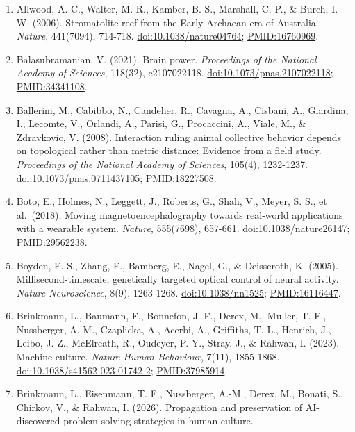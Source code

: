 \documentclass[10pt,letterpaper]{article}
\providecommand{\tightlist}{\setlength{\itemsep}{1pt}\setlength{\parskip}{0pt}}
\begin{document}
\begin{enumerate}
\def\labelenumi{\arabic{enumi}.}
\tightlist
\item
  Allwood, A. C., Walter, M. R., Kamber, B. S., Marshall, C. P., \&
  Burch, I. W. (2006). Stromatolite reef from the Early Archaean era of
  Australia. \emph{Nature}, 441(7094), 714-718.
  \href{https://doi.org/10.1038/nature04764}{doi:10.1038/nature04764};
  \url{PMID:16760969}.
\item
  Balasubramanian, V. (2021). Brain power. \emph{Proceedings of the
  National Academy of Sciences}, 118(32), e2107022118.
  \href{https://doi.org/10.1073/pnas.2107022118}{doi:10.1073/pnas.2107022118};
  \url{PMID:34341108}.
\item
  Ballerini, M., Cabibbo, N., Candelier, R., Cavagna, A., Cisbani, A.,
  Giardina, I., Lecomte, V., Orlandi, A., Parisi, G., Procaccini, A.,
  Viale, M., \& Zdravkovic, V. (2008). Interaction ruling animal
  collective behavior depends on topological rather than metric
  distance: Evidence from a field study. \emph{Proceedings of the
  National Academy of Sciences}, 105(4), 1232-1237.
  \href{https://doi.org/10.1073/pnas.0711437105}{doi:10.1073/pnas.0711437105};
  \url{PMID:18227508}.
\item
  Boto, E., Holmes, N., Leggett, J., Roberts, G., Shah, V., Meyer, S.
  S., et al.~(2018). Moving magnetoencephalography towards real-world
  applications with a wearable system. \emph{Nature}, 555(7698),
  657-661.
  \href{https://doi.org/10.1038/nature26147}{doi:10.1038/nature26147};
  \url{PMID:29562238}.
\item
  Boyden, E. S., Zhang, F., Bamberg, E., Nagel, G., \& Deisseroth, K.
  (2005). Millisecond-timescale, genetically targeted optical control of
  neural activity. \emph{Nature Neuroscience}, 8(9), 1263-1268.
  \href{https://doi.org/10.1038/nn1525}{doi:10.1038/nn1525};
  \url{PMID:16116447}.
\item
  Brinkmann, L., Baumann, F., Bonnefon, J.-F., Derex, M., Muller, T. F.,
  Nussberger, A.-M., Czaplicka, A., Acerbi, A., Griffiths, T. L.,
  Henrich, J., Leibo, J. Z., McElreath, R., Oudeyer, P.-Y., Stray, J.,
  \& Rahwan, I. (2023). Machine culture. \emph{Nature Human Behaviour},
  7(11), 1855-1868.
  \href{https://doi.org/10.1038/s41562-023-01742-2}{doi:10.1038/s41562-023-01742-2};
  \url{PMID:37985914}.
\item
  Brinkmann, L., Eisenmann, T. F., Nussberger, A.-M., Derex, M., Bonati,
  S., Chirkov, V., \& Rahwan, I. (2026). Propagation and preservation of
  AI-discovered problem-solving strategies in human culture.

\end{enumerate}
\end{document}

